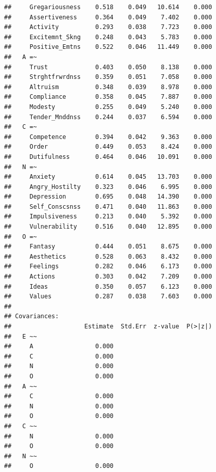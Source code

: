 \documentclass{article}\usepackage[]{graphicx}\usepackage[]{color}
\makeatletter
\newenvironment{kframe}{%
 \def\at@end@of@kframe{}%
 \ifinner\ifhmode%
  \def\at@end@of@kframe{\end{minipage}}%
  \begin{minipage}{\columnwidth}%
 \fi\fi%
 \def\FrameCommand##1{\hskip\@totalleftmargin \hskip-\fboxsep
 \colorbox{shadecolor}{##1}\hskip-\fboxsep
     \hskip-\linewidth \hskip-\@totalleftmargin \hskip\columnwidth}%
 \MakeFramed {\advance\hsize-\width
   \@totalleftmargin\z@ \linewidth\hsize
   \@setminipage}}%
 {\par\unskip\endMakeFramed%
 \at@end@of@kframe}
\newenvironment{knitrout}{}{} %
\makeatother
\begin{document}
\begin{knitrout}
\begin{kframe}
\begin{verbatim}
##     Gregariousness    0.518    0.049   10.614    0.000
##     Assertiveness     0.364    0.049    7.402    0.000
##     Activity          0.293    0.038    7.723    0.000
##     Excitemnt_Skng    0.248    0.043    5.783    0.000
##     Positive_Emtns    0.522    0.046   11.449    0.000
##   A =~                                                
##     Trust             0.403    0.050    8.138    0.000
##     Strghtfrwrdnss    0.359    0.051    7.058    0.000
##     Altruism          0.348    0.039    8.978    0.000
##     Compliance        0.358    0.045    7.887    0.000
##     Modesty           0.255    0.049    5.240    0.000
##     Tender_Mnddnss    0.244    0.037    6.594    0.000
##   C =~                                                
##     Competence        0.394    0.042    9.363    0.000
##     Order             0.449    0.053    8.424    0.000
##     Dutifulness       0.464    0.046   10.091    0.000
##   N =~                                                
##     Anxiety           0.614    0.045   13.703    0.000
##     Angry_Hostilty    0.323    0.046    6.995    0.000
##     Depression        0.695    0.048   14.390    0.000
##     Self_Conscsnss    0.471    0.040   11.863    0.000
##     Impulsiveness     0.213    0.040    5.392    0.000
##     Vulnerability     0.516    0.040   12.895    0.000
##   O =~                                                
##     Fantasy           0.444    0.051    8.675    0.000
##     Aesthetics        0.528    0.063    8.432    0.000
##     Feelings          0.282    0.046    6.173    0.000
##     Actions           0.303    0.042    7.209    0.000
##     Ideas             0.350    0.057    6.123    0.000
##     Values            0.287    0.038    7.603    0.000
## 
## Covariances:
##                    Estimate  Std.Err  z-value  P(>|z|)
##   E ~~                                                
##     A                 0.000                           
##     C                 0.000                           
##     N                 0.000                           
##     O                 0.000                           
##   A ~~                                                
##     C                 0.000                           
##     N                 0.000                           
##     O                 0.000                           
##   C ~~                                                
##     N                 0.000                           
##     O                 0.000                           
##   N ~~                                                
##     O                 0.000                           

\end{verbatim}
\end{kframe}
\end{knitrout}
\end{document}
